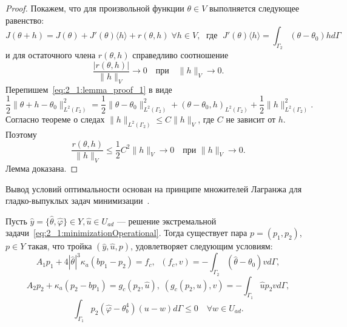 \begin{proof}
    Покажем, что для произвольной функции $\theta \in V$ выполняется следующее равенство:
    \begin{equation}
        \label{eq:2_1:lemma_proof_1}
        J(\theta + h) = J(\theta) + J'(\theta)\langle h \rangle
        + r(\theta, h) \; \forall h \in V, \; \text{ где } \;
        J'(\theta)\langle h \rangle = \int_{\Gamma_2} (\theta - \theta_0)h d\Gamma
    \end{equation}
    и для остаточного члена $r(\theta,h)$ справедливо соотношение
    \begin{equation}
        \label{eq:2_1:lemma_proof_2}
        \frac{|r(\theta,h)|}{\|h\|_V} \rightarrow 0
        \quad \text{при} \quad \|h\|_V \rightarrow 0.
    \end{equation}
    Перепишем~\eqref{eq:2_1:lemma_proof_1} в виде
    \[
        \frac{1}{2} \|\theta + h - \theta_0\|^2_{L^2(\Gamma_2)} =
        \frac{1}{2} \| \theta - \theta_0 \|^2_{L^2(\Gamma_2)} +
        (\theta - \theta_0, h)_{L^2(\Gamma_2)} +
        \frac{1}{2}\| h \|^2_{L^2(\Gamma_2)}.
    \]
    Согласно теореме о следах $ \|h\|_{L^2(\Gamma_2)} \le C \|h\|_V $,
    где $C$ не зависит от $h$.
    Поэтому
    \[
        \frac{r(\theta,h)}{\| h \|_V} \leq
        \frac{1}{2} C^2 \| h \|_V \rightarrow 0 \quad \text{при } \| h \|_V \rightarrow 0.
    \]
    Лемма доказана.
\end{proof}

Вывод условий оптимальности основан на принципе множителей
Лагранжа для гладко-выпуклых задач минимизации~\cite[Теорема 1.5]{10}.
\begin{theorem}
    \label{th:2_1:2}
    Пусть $\hat{y}=\{\hat{\theta},\hat{\varphi} \} \in Y, \hat{u} \in U_{ad}$
    --- решение экстремальной задачи~\eqref{eq:2_1:minimizationOperational}.
    Тогда существует пара $p = (p_1, p_2)$, $p \in Y$
    такая, что тройка $(\hat{y}, \hat{u}, p)$, удовлетворяет следующим условиям:
    \begin{equation}
        \label{eq:2_1:theorem_2_eq1}
        A_1 p_1 + 4 |\hat{\theta}|^3 \kappa_a(b p_1 - p_2) = f_c,
        \;\; (f_c,v) = - \int_{\Gamma_2} (\hat{\theta} - \theta_0) v d\Gamma,
    \end{equation}
    \begin{equation}
        \label{eq:2_1:theorem_2_eq2}
        A_2 p_2 + \kappa_a (p_2-b p_1) = g_c(p_2, \hat{u}),
        \;(g_c(p_2, \hat{u}), v) = -\int_{\Gamma_1} \hat{u} p_2 v d\Gamma,
    \end{equation}
    \begin{equation}
        \label{eq:2_1:theorem_2_eq3}
        \int_{\Gamma_1} p_2 (\hat{\varphi} - \theta_b^4)(u-w) d\Gamma
        \leq 0 \quad \forall w \in U_{ad}.
    \end{equation}
\end{theorem}

